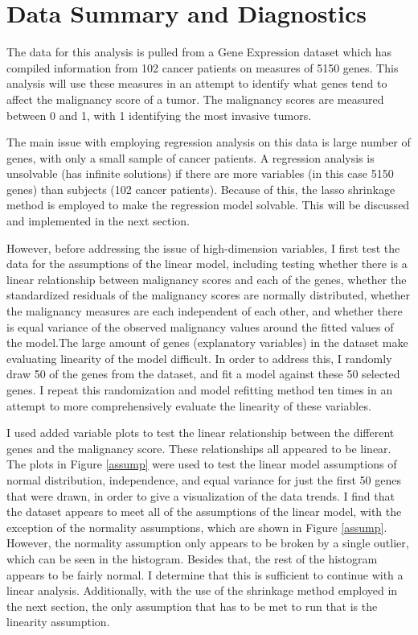\documentclass{svproc}
\begin{document}
\section{Data Summary and Diagnostics}

The data for this analysis is pulled from a Gene Expression dataset which has compiled information from 102 cancer patients on measures of 5150 genes. This analysis will use these measures in an attempt to identify what genes tend to affect the malignancy score of a tumor. The malignancy scores are measured between 0 and 1, with 1 identifying the most invasive tumors.

The main issue with employing regression analysis on this data is large number of genes, with only a small sample of cancer patients. A regression analysis is unsolvable (has infinite solutions) if there are more variables (in this case 5150 genes) than subjects (102 cancer patients). Because of this, the lasso shrinkage method is employed to make the regression model solvable. This will be discussed and implemented in the next section.

However, before addressing the issue of high-dimension variables, I first test the data for the assumptions of the linear model, including testing whether there is a linear relationship between malignancy scores and each of the genes, whether the standardized residuals of the malignancy scores are normally distributed, whether the malignancy measures are each independent of each other, and whether there is equal variance of the observed malignancy values around the fitted values of the model.The large amount of genes (explanatory variables) in the dataset make evaluating linearity of the model difficult. In order to address this, I randomly draw 50 of the genes from the dataset, and fit a model against these 50 selected genes. I repeat this randomization and model refitting method ten times in an attempt to more comprehensively evaluate the linearity of these variables.

I used added variable plots to test the linear relationship between the different genes and the malignancy score. These relationships all appeared to be linear. The plots in Figure \ref{assump} were used to test the linear model assumptions of normal distribution, independence, and equal variance for just the first 50 genes that were drawn, in order to give a visualization of the data trends. I find that the dataset appears to meet all of the assumptions of the linear model, with the exception of the normality assumptions, which are shown in Figure \ref{assump}. However, the normality assumption only appears to be broken by a single outlier, which can be seen in the histogram. Besides that, the rest of the histogram appears to be fairly normal. I determine that this is sufficient to continue with a linear analysis. Additionally, with the use of the shrinkage method employed in the next section, the only assumption that has to be met to run that is the linearity assumption. 
\end{document}

